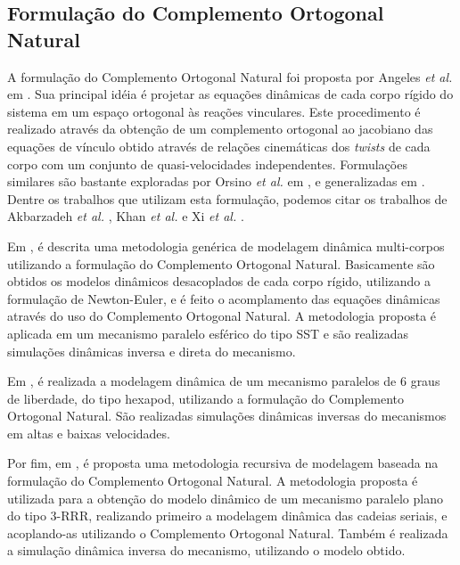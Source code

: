 \documentclass[]{politex}
\begin{document}
\subsection{Formulação do Complemento Ortogonal Natural}

A formulação do Complemento Ortogonal Natural foi proposta por Angeles \emph{et al.} em \cite{Angeles}. Sua principal idéia é projetar as equações dinâmicas de cada corpo rígido do sistema em um espaço ortogonal às reações vinculares. Este procedimento é realizado através da obtenção de um complemento ortogonal ao jacobiano das equações de vínculo obtido através de relações cinemáticas dos \emph{twists} de cada corpo com um conjunto de quasi-velocidades independentes. Formulações similares são bastante exploradas por Orsino \emph{et al.} em \cite{22orsino}, e generalizadas em \cite{23orsino}. Dentre os trabalhos que utilizam esta formulação, podemos citar os trabalhos de Akbarzadeh \emph{et al.} \cite{Akbarzadeh}, Khan \emph{et al.} \cite{Khan} e Xi \emph{et al.} \cite{Xi}.

Em \cite{Akbarzadeh}, é descrita uma metodologia genérica de modelagem dinâmica multi-corpos utilizando a formulação do Complemento Ortogonal Natural. Basicamente são obtidos os modelos dinâmicos desacoplados de cada corpo rígido, utilizando a formulação de Newton-Euler, e é feito o acomplamento das equações dinâmicas através do uso do Complemento Ortogonal Natural. A metodologia proposta é aplicada em um mecanismo paralelo esférico do tipo SST e são realizadas simulações dinâmicas inversa e direta do mecanismo.

Em \cite{Xi}, é realizada a modelagem dinâmica de um mecanismo paralelos de 6 graus de liberdade, do tipo hexapod, utilizando a formulação do Complemento Ortogonal Natural. São realizadas simulações dinâmicas inversas do mecanismos em altas e baixas velocidades.

Por fim, em \cite{Khan}, é proposta uma metodologia recursiva de modelagem baseada na formulação do Complemento Ortogonal Natural. A metodologia proposta é utilizada para a obtenção do modelo dinâmico de um mecanismo paralelo plano do tipo 3-RRR, realizando primeiro a modelagem dinâmica das cadeias seriais, e acoplando-as utilizando o Complemento Ortogonal Natural. Também é realizada a simulação dinâmica inversa do mecanismo, utilizando o modelo obtido.








\end{document}
